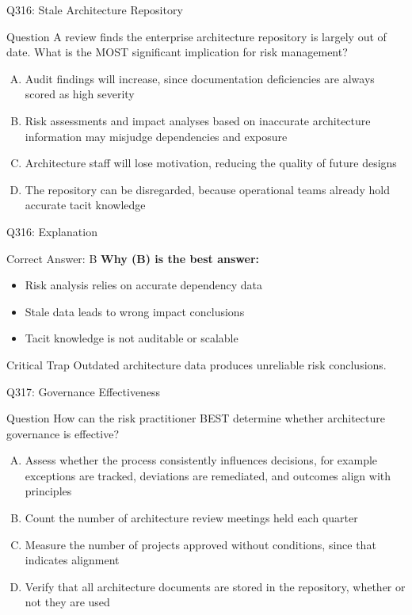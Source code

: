 \documentclass{beamer}
\begin{document}
	\begin{frame}{Q316: Stale Architecture Repository}
		\begin{block}{Question}
			\small A review finds the enterprise architecture repository is largely out of date. What is the MOST significant implication for risk management?
		\end{block}
		\begin{enumerate}[(A)]
			\footnotesize
			\item Audit findings will increase, since documentation deficiencies are always scored as high severity
			\item Risk assessments and impact analyses based on inaccurate architecture information may misjudge dependencies and exposure
			\item Architecture staff will lose motivation, reducing the quality of future designs
			\item The repository can be disregarded, because operational teams already hold accurate tacit knowledge
		\end{enumerate}
	\end{frame}
	
	\begin{frame}{Q316: Explanation}
		\begin{block}{Correct Answer: B}
			\textbf{Why (B) is the best answer:}
			\begin{itemize}
				\item Risk analysis relies on accurate dependency data
				\item Stale data leads to wrong impact conclusions
				\item Tacit knowledge is not auditable or scalable
			\end{itemize}
		\end{block}
		\begin{alertblock}{Critical Trap}
			Outdated architecture data produces unreliable risk conclusions.
		\end{alertblock}
	\end{frame}
	
	\begin{frame}{Q317: Governance Effectiveness}
		\begin{block}{Question}
			\small How can the risk practitioner BEST determine whether architecture governance is effective?
		\end{block}
		\begin{enumerate}[(A)]
			\footnotesize
			\item Assess whether the process consistently influences decisions, for example exceptions are tracked, deviations are remediated, and outcomes align with principles
			\item Count the number of architecture review meetings held each quarter
			\item Measure the number of projects approved without conditions, since that indicates alignment
			\item Verify that all architecture documents are stored in the repository, whether or not they are used
		\end{enumerate}
	\end{frame}
	
\end{document}
